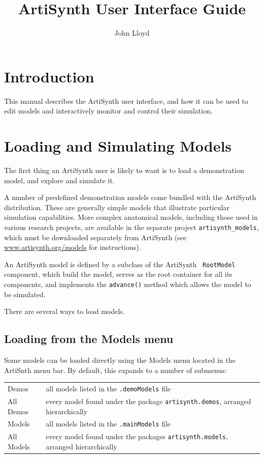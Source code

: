 \documentclass{article}
\title{ArtiSynth User Interface Guide}
\author{John Lloyd}
\date{}
\begin{document}
\maketitle

\iflatexml{\large\pubdate}\fi

\tableofcontents

\section{Introduction}

This manual describes the ArtiSynth user interface, and how it can be
used to edit models and interactively monitor and control their
simulation.

\section{Loading and Simulating Models}

The first thing an ArtiSynth user is likely to want is to load a
demonstration model, and explore and simulate it.

A number of predefined demonstration models come bundled with the
ArtiSynth distribution. These are generally simple models that
illustrate particular simulation capabilities. More complex
anatomical models, including those used in various research projects,
are available in the separate project {\tt artisynth\_models}, which
must be downloaded separately from ArtiSynth (see
\href{http://www.artisynth.org/models}
{www.artisynth.org/models} for instructions).

An ArtiSynth model is defined by a subclass of the ArtiSynth {\tt
RootModel} component, which build the model, serves as the root
container for all its components, and implements the {\tt advance()}
method which allows the model to be simulated.

There are several ways to load models.

\subsection{Loading from the Models menu}
\label{LoadingFromModelsMenu}

Some models can be loaded directly using the {\sf Models} menu located
in the ArtiSnth menu bar. By default, this expands to a number of
submenus:

\begin{tabular}{ll}
{\sf Demos} & all models listed in the {\tt .demoModels} file\\
{\sf All Demos} & every model found under the package {\tt artisynth.demos}, 
arranged hierarchically\\
{\sf Models} & all models listed in the {\tt .mainModels} file\\
{\sf All Models} & every model found under the packages 
{\tt artisynth.models}, arranged hierarchically
\end{tabular}
\medskip
\end{document}
